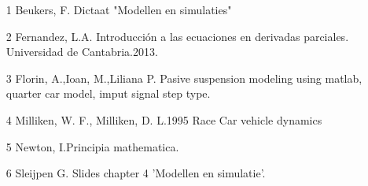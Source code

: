 \documentclass[a4paper]{article}
\begin{document}
\begin{itemize}
	\item [1]Beukers, F. Dictaat "Modellen en simulaties"
	\item [2]Fernandez, L.A. Introducción a las ecuaciones en derivadas parciales. Universidad de Cantabria.2013.
    \item [3]Florin, A.,Ioan, M.,Liliana P. Pasive suspension modeling using matlab, quarter car model, imput signal step type.  
    \item [4]Milliken, W. F., Milliken, D. L.1995 Race Car vehicle dynamics
	\item [5]Newton, I.Principia mathematica.
	\item [6]Sleijpen G. Slides chapter 4 'Modellen en simulatie'.

\end{itemize}
\end{document}
